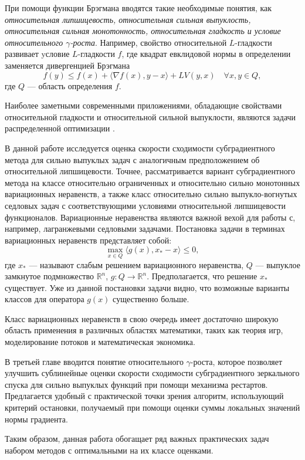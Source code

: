 При помощи функции Брэгмана вводятся такие необходимые понятия, как \textit{относительная липшицевость, относительная сильная выпуклость, относительная сильная монотонность, относительная гладкость и условие относительного $\gamma$-роста}. Например, свойство относительной $L$-гладкости развивает yсловие $L$-гладкости $f$, где квадрат евклидовой нормы в определении заменяется дивергенцией Брэгмана
$$
    f(y) \leq f(x) + \langle \nabla{f(x)}, y - x \rangle  + L V(y,x) \quad   \forall x, y \in Q,
$$
где $Q$ --- область определения $f$.

 Наиболее заметными современными приложениями, обладающие свойствами относительной гладкости и относительной сильной выпуклости, являются задачи распределенной оптимизации \cite{Hendr}. 

В данной работе исследуется оценка скорости сходимости субградиентного метода для сильно выпуклых задач с аналогичным предположением об относительной липшицевости. Точнее, рассматривается вариант субградиентного метода на классе относительно ограниченных и относительно сильно монотонных вариационных неравенств, а также класс относительно сильно выпукло-вогнутых седловых задач с соответствующими условиями относительной липшицевости функционалов. Вариационные неравенства являются важной вехой для работы с, например, лагранжевыми седловыми задачами. Постановка задачи в терминах вариационных неравенств представляет собой: 
$$
    \max_{x \in Q} \langle g(x), x_* - x \rangle \leq 0,
$$
где $x_*$ --- называют слабым решением вариационного неравенства, $Q$ --- выпуклое замкнутое подмножество $\mathbb{R}^n$, $g: Q \longrightarrow \mathbb{R}^n$. Предполагается, что решение $x_*$ существует. Уже из данной постановки задачи видно, что возможные варианты классов для оператора $g(x)$ существенно больше.

Класс вариационных неравенств в свою очередь имеет достаточно широкую область применения в различных областях математики, таких как теория игр, моделирование потоков и математическая экономика. 

В третьей главе вводится понятие относительного $\gamma$-роста, которое позволяет улучшить сублинейные оценки скорости сходимости субградиентного зеркального спуска для сильно выпуклых функций при помощи механизма рестартов. Предлагается удобный с практической точки зрения алгоритм, использующий критерий остановки, получаемый при помощи оценки суммы локальных значений нормы градиента. 

Таким образом, данная работа обогащает ряд важных практических задач набором методов с оптимальными на их классе оценками.

